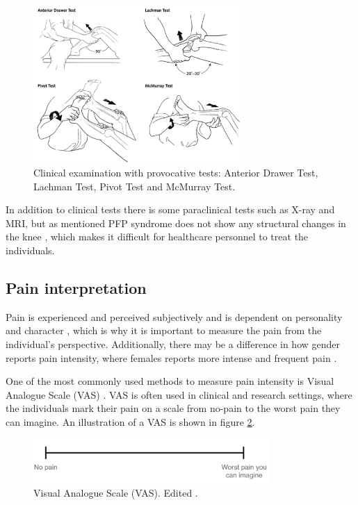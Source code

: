 \begin{figure} [H]
\centering
\includegraphics[width=0.7\textwidth]{figures/kneetest}
\caption{Clinical examination with provocative tests: Anterior Drawer Test, Lachman Test, Pivot Test and McMurray Test.\citep{Ghosh2010}}
\label{fig:kneetest}
\end{figure}


\noindent
In addition to clinical tests there is some paraclinical tests such as X-ray and MRI, but as mentioned PFP syndrome does not show any structural changes in the knee \citep{Petersen2013}, which makes it difficult for healthcare personnel to treat the individuals. 

\subsection{Pain interpretation}
Pain is experienced and perceived subjectively \citep{IASP2012, Younger2009} and is dependent on personality and character \citep{Schmidt2013}, which is why it is important to measure the pain from the individual’s perspective. Additionally, there may be a difference in how gender reports pain intensity, where females reports more intense and frequent pain \citep{Pieh2012}.
 
\noindent
One of the most commonly used methods to measure pain intensity is Visual Analogue Scale (VAS) \citep{Valente2011}. VAS is often used in clinical and research settings, where the individuals mark their pain on a scale from no-pain to the worst pain they can imagine.\citep{Haefeli2005} An illustration of a VAS is shown in figure \ref{fig:VAS}.

\begin{figure} [H]
\centering
\includegraphics[width=0.8\textwidth]{figures/VAS}
\caption{Visual Analogue Scale (VAS). Edited \citep{Haefeli2005}.}
\label{fig:VAS}
\end{figure}

